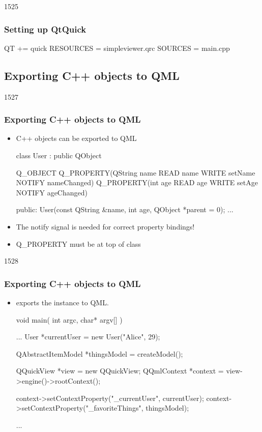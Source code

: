 \begin{slide}[fragile]{1525}\frametitle{Setting up QtQuick}

\begin{qmake}
QT       += quick
RESOURCES = simpleviewer.qrc
SOURCES   = main.cpp
\end{qmake}

\end{slide}

\subsection{Exporting C++ objects to QML}
\begin{slide}[fragile]{1527}\frametitle{Exporting C++ objects to QML}
\begin{itemize}
\item C++ objects can be exported to QML
\begin{cpp}
class User : public QObject
{
    Q_OBJECT
    Q_PROPERTY(QString name READ name WRITE setName
               NOTIFY nameChanged)
    Q_PROPERTY(int age READ age WRITE setAge NOTIFY ageChanged)

public:
    User(const QString &name, int age, QObject *parent = 0);
    ...
}
\end{cpp}
\item The notify signal is needed for correct property bindings!
\item Q\_PROPERTY must be at top of class
\end{itemize}

\end{slide}


\begin{slide}[fragile]{1528}\frametitle{Exporting C++ objects to QML}
\begin{itemize}
\item {} exports the instance to QML.\\[4mm]

\begin{cpp}
void main( int argc, char* argv[] ) {
    ...
    User *currentUser = new User("Alice", 29);

    QAbstractItemModel *thingsModel = createModel();

    QQuickView *view = new QQuickView;
    QQmlContext *context = view->engine()->rootContext();

    context->setContextProperty("_currentUser", currentUser);
    context->setContextProperty("_favoriteThings", thingsModel);

    ...
}
\end{cpp}
\end{itemize}
\end{slide}

